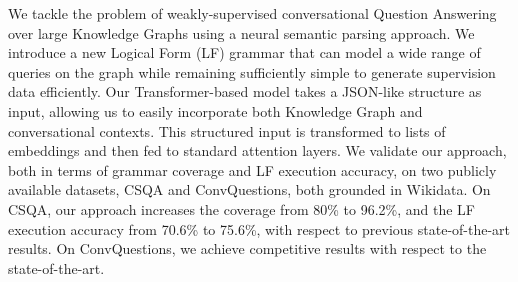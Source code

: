 We tackle the problem of weakly-supervised conversational Question Answering over large Knowledge Graphs using a neural semantic parsing approach. We introduce a new Logical Form (LF) grammar that can model a wide range of queries on the graph while remaining sufficiently simple to generate supervision data efficiently. Our Transformer-based model takes a JSON-like structure as input, allowing us to easily incorporate both Knowledge Graph and conversational contexts. This structured input is transformed to lists of embeddings and then fed to standard attention layers. We validate our approach, both in terms of grammar coverage and LF execution accuracy, on two publicly available datasets, CSQA and ConvQuestions, both grounded in Wikidata. On CSQA, our approach increases the coverage from 80\% to 96.2\%, and the LF execution accuracy from 70.6\% to 75.6\%, with respect to previous state-of-the-art results. On ConvQuestions, we achieve competitive results with respect to the state-of-the-art.
